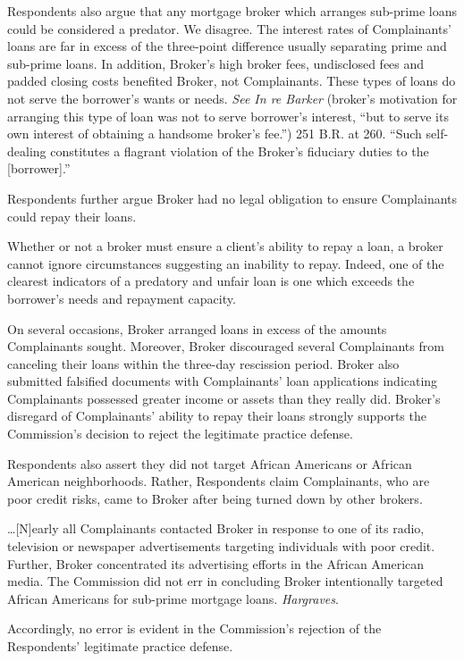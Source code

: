 Respondents also argue that any mortgage broker which arranges sub-prime loans
could be considered a predator. We disagree. The interest rates of
Complainants' loans are far in excess of the three-point difference usually
separating prime and sub-prime loans. In addition, Broker's high broker fees,
undisclosed fees and padded closing costs benefited Broker, not Complainants.
These types of loans do not serve the borrower's wants or needs. \textit{See In
re Barker} (broker's motivation for arranging this type of loan was not to
serve borrower's interest, ``but to serve its own interest of obtaining a
handsome broker's fee.'')
251 B.R. at 260. ``Such self-dealing constitutes a flagrant violation of the
Broker's fiduciary duties to the [borrower].'' 

Respondents further argue Broker had no legal obligation to ensure Complainants
could repay their loans.

Whether or not a broker must ensure a client's ability to repay a loan, a broker
cannot ignore circumstances suggesting an inability to repay. Indeed, one of
the clearest indicators of a predatory and unfair loan is one which exceeds the
borrower's needs and repayment capacity. 

On several occasions, Broker arranged loans in excess of the amounts
Complainants sought. Moreover, Broker discouraged several Complainants from
canceling their loans within the three-day rescission period. Broker also
submitted falsified documents with Complainants' loan applications indicating
Complainants possessed greater income or assets than they really did. Broker's
disregard of Complainants' ability to repay their loans strongly supports the
Commission's decision to reject the legitimate practice defense.

Respondents also assert they did not target African Americans or African
American neighborhoods. Rather, Respondents claim Complainants, who are poor
credit risks, came to Broker after being turned down by other brokers.

\dots [N]early all Complainants contacted Broker in response to one of its
radio, television or newspaper advertisements targeting individuals with poor
credit. Further, Broker concentrated its advertising efforts in the African
American media. The Commission did not err in concluding Broker intentionally
targeted African Americans for sub-prime mortgage loans. \textit{Hargraves}.

Accordingly, no error is evident in the Commission's rejection of the
Respondents' legitimate practice defense.

